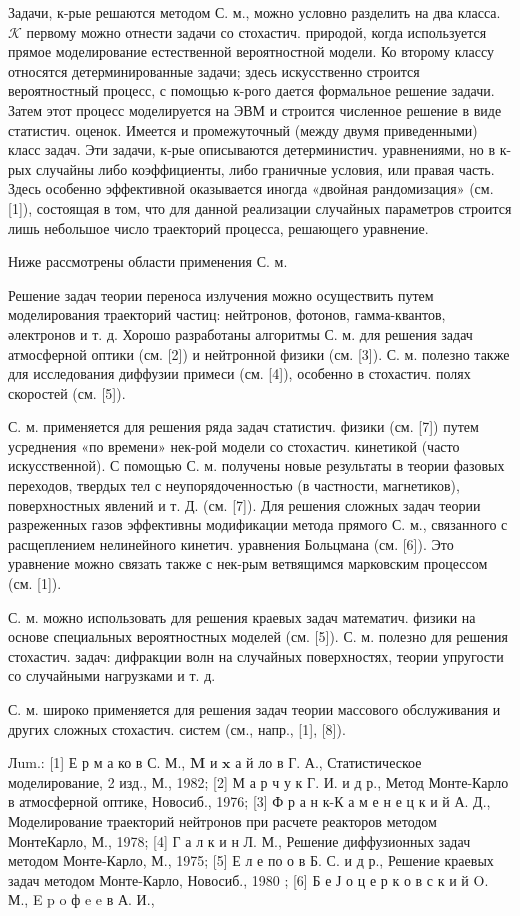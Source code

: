 \documentclass[10pt]{article}
\begin{document}
Задачи, к-рые решаются методом С. м., можно условно разделить на два класса. $\mathcal{K}$ первому можно отнести задачи со стохастич. природой, когда используется прямое моделирование естественной вероятностной модели. Ко второму классу относятся детерминированные задачи; здесь искусственно строится вероятностный процесс, с помощью к-рого дается формальное решение задачи. Затем этот процесс моделируется на ЭВМ и строится численное решение в виде статистич. оценок. Имеется и промежуточный (между двумя приведенными) класс задач. Эти задачи, к-рые описываются детерминистич. уравнениями, но в к-рых случайны либо коэффициенты, либо граничные условия, или правая часть. Здесь особенно эффективной оказывается иногда «двойная рандомизация» (см. [1]), состоящая в том, что для данной реализации случайных параметров строится лишь небольшое число траекторий процесса, решающего уравнение.



Ниже рассмотрены области применения С. м.



Решение задач теории переноса излучения можно осуществить путем моделирования траекторий частиц: нейтронов, фотонов, гамма-квантов, әлектронов и т. д. Хорошо разработаны алгоритмы С. м. для решения задач атмосферной оптики (см. [2]) и нейтронной физики (см. [3]). С. м. полезно также для исследования диффузии примеси (см. [4]), особенно в стохастич. полях скоростей (см. [5]).



С. м. применяется для решения ряда задач статистич. физики (см. [7]) путем усреднения «по времени» нек-рой модели со стохастич. кинетикой (часто искусственной). С помощью С. м. получены новые результаты в теории фазовых переходов, твердых тел с неупорядоченностью (в частности, магнетиков), поверхностных явлений и т. Д. (см. [7]). Для решения сложных задач теории разреженных газов эффективны модификации метода прямого С. м., связанного с расщеплением нелинейного кинетич. уравнения Больцмана (см. [6]). Это уравнение можно связать также с нек-рым ветвящимся марковским процессом (см. [1]).



С. м. можно использовать для решения краевых задач математич. физики на основе специальных вероятностных моделей (см. [5]). С. м. полезно для решения стохастич. задач: дифракции волн на случайных поверхностях, теории упругости со случайными нагрузками и т. д.



С. м. широко применяется для решения задач теории массового обслуживания и других сложных стохастич. систем (см., напр., [1], [8]).



Лum.: [1] Е р м а ко в С. М., $\mathbf{M}$ и $\mathbf{x}$ а й ло в Г. А., Статистическое моделирование, 2 изд., М., 1982; [2] М а р ч у к Г. И. и д р., Метод Монте-Карло в атмосферной оптике, Новосиб., 1976; [3] Ф р а н к-К а м е н е ц к и й А. Д., Моделирование траекторий нейтронов при расчете реакторов методом МонтеКарло, М., 1978; [4] Г а л к и н Л. М., Решение диффузионных задач методом Монте-Карло, М., 1975; [5] Е л е по о в Б. С. и д р., Решение краевых задач методом Монте-Карло, Новосиб., 1980 ; [6] Б е Ј о ц е р к о в с к и й O. М., E p o ф e e в А. И.,
\end{document}
